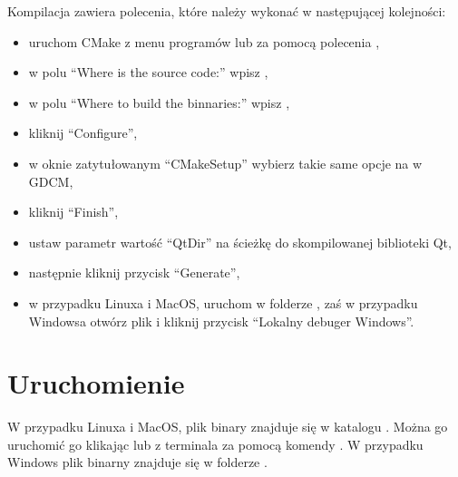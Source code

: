 Kompilacja zawiera polecenia, które należy wykonać w następującej kolejności:
\begin{itemize}
    \item uruchom CMake z menu programów lub za pomocą polecenia ,
    \item w polu \enquote{Where is the source code:} wpisz ,
    \item w polu \enquote{Where to build the binnaries:} wpisz ,
    \item kliknij \enquote{Configure},
    \item w oknie zatytułowanym \enquote{CMakeSetup} wybierz takie same opcje na w GDCM,
    \item kliknij \enquote{Finish},
    \item ustaw parametr wartość \enquote{QtDir} na ścieżkę do skompilowanej biblioteki Qt,
    \item następnie kliknij przycisk \enquote{Generate},
    \item w przypadku Linuxa i MacOS, uruchom  w folderze , zaś w przypadku Windowsa otwórz plik  i kliknij przycisk \enquote{Lokalny debuger Windows}.
\end{itemize}

\section{Uruchomienie}

W przypadku Linuxa i MacOS, plik binary znajduje się w katalogu .
Można go uruchomić go klikając lub z terminala za pomocą komendy .
W przypadku Windows plik binarny znajduje się w folderze .